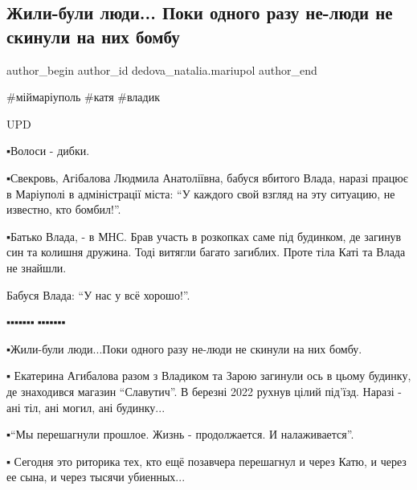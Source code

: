  
 
 
 
 

\subsection{Жили-були люди... Поки одного разу не-люди не скинули на них бомбу}
\label{sec:01_02_2023.fb.dedova_natalia.mariupol.1.zhili_buli_lyudi__po}

\ifcmt
 author_begin
   author_id dedova_natalia.mariupol
 author_end
\fi

\obeycr
\#міймаріуполь 
\#катя
\#владик
\restorecr

UPD 

▪️Волоси - дибки.

▪️Свекровь, Агібалова Людмила Анатоліївна, бабуся вбитого Влада, наразі працює в
Маріуполі в адміністрації міста: \enquote{У каждого свой взгляд на эту ситуацию, не
известно, кто бомбил!}. 

▪️Батько Влада, - в МНС. Брав участь в розкопках саме під будинком, де загинув
син та колишня дружина. Тоді витягли багато загиблих. Проте тіла Каті та Влада
не знайшли. 

Бабуся Влада: \enquote{У нас у всё хорошо!}. 

▪️▪️▪️▪️▪️▪️▪️🖤▪️▪️▪️▪️▪️▪️▪️

▪️Жили-були люди...Поки одного разу не-люди не скинули на них бомбу. 

▪️ Екатерина Агибалова разом з Владиком та Зарою загинули ось в цьому будинку,
де знаходився магазин \enquote{Славутич}. В березні 2022 рухнув цілий під'їзд. Наразі -
ані тіл, ані могил, ані будинку...

▪️\enquote{Мы перешагнули прошлое. Жизнь - продолжается. И налаживается}. 

▪️ Сегодня это риторика тех, кто ещё позавчера перешагнул и через Катю, и через
ее сына, и через тысячи убиенных...
